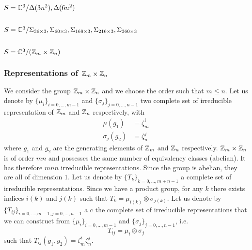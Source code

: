 \documentclass[a4paper,10pt]{article}
\begin{document}
    \subsection{$S=\mathbb{C}^3/\Delta(3n^2),\Delta(6n^2)$}

    \subsection{$S=\mathbb{C}^3/\Sigma_{36\times 3},\Sigma_{60\times 3},\Sigma_{168\times 3},\Sigma_{216\times 3},\Sigma_{360\times 3}$}


    \subsection{$S=\mathbb{C}^3/(\mathbb{Z}_m\times\mathbb{Z}_n)$}

        \subsubsection{Representations of $\mathbb{Z}_m\times\mathbb{Z}_n$}

           We consider the group $\mathbb{Z}_m\times\mathbb{Z}_n$ and we choose the order such that $m\leq n$.  Let us denote by $\{\mu_i\}_{i=0,\dots,m-1}$ and $\{\sigma_j\}_{j=0,\dots,n-1}$ two complete set of irreducible representation of $\mathbb{Z}_m$ and $\mathbb{Z}_n$ respectively, with
           \begin{align}
               \mu(g_1)&=\zeta^i_m\\
               \sigma_j(g_2)&=\zeta^j_n
           \end{align}
           where $g_1$ and $g_2$ are the generating elements of $\mathbb{Z}_m$ and $\mathbb{Z}_n$ respectively. $\mathbb{Z}_m\times\mathbb{Z}_n$ is of order $mn$ and possesses the same number of equivalency classes (abelian). It has therefore $mnn$ irreducible representations. Since the group is abelian, they are all of dimension $1$. Let us denote by $\{T_k\}_{k=0,\dots,m+n-1}$ a complete set of irreducible representations. Since we have a product group, for any $k$ there exists indices $i(k)$ and $j(k)$ such that $T_k=\mu_{i(k)}\otimes\sigma_{j(k)}$. Let us denote by $\{T_{ij}\}_{i=0,\dots,m-1,j=0,\dots,n-1}$ a c the complete set of irreducible representations that we can construct from $\{\mu_i\}_{i=0,\dots,m-1}$ and $\{\sigma_j\}_{j=0,\dots,n-1}$, i.e.
           \begin{equation}
               T_{ij}=\mu_i\otimes\sigma_j
           \end{equation}
           such that $T_{ij}(g_1,g_2)=\zeta^i_m\zeta^j_n$.
\end{document}
